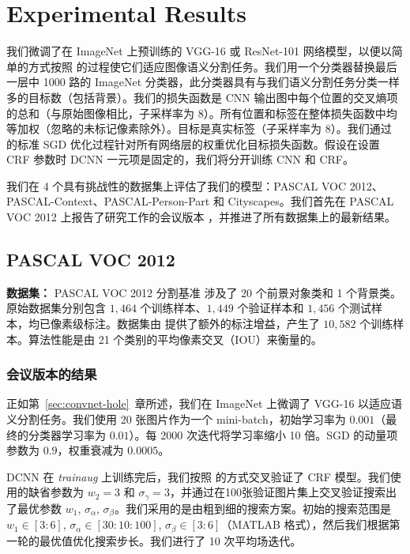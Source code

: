\section{Experimental Results}
\label{sec:experiments}

我们微调了在 ImageNet 上预训练的 VGG-16 或 ResNet-101 网络模型，以便以简单的方式按照 \cite{long2014fully} 的过程使它们适应图像语义分割任务。我们用一个分类器替换最后一层中 1000 路的 ImageNet 分类器，此分类器具有与我们语义分割任务分类一样多的目标数（包括背景）。我们的损失函数是 CNN 输出图中每个位置的交叉熵项的总和（与原始图像相比，子采样率为 8）。所有位置和标签在整体损失函数中均等加权（忽略的未标记像素除外）。目标是真实标签（子采样率为 8）。我们通过 \cite{KrizhevskyNIPS2013} 的标准 SGD 优化过程针对所有网络层的权重优化目标损失函数。假设在设置 CRF 参数时 DCNN 一元项是固定的，我们将分开训练 CNN 和 CRF。

我们在 4 个具有挑战性的数据集上评估了我们的模型：PASCAL VOC 2012、PASCAL-Context、PASCAL-Person-Part 和 Cityscapes。我们首先在 PASCAL VOC 2012 上报告了研究工作的会议版本 \cite{chen2014semantic}，并推进了所有数据集上的最新结果。

\subsection{PASCAL VOC 2012}

\textbf{数据集：} PASCAL VOC 2012 分割基准 \cite{everingham2014pascal} 涉及了 20 个前景对象类和 1 个背景类。原始数据集分别包含 $1,464$ 个训练样本、$1,449$ 个验证样本和 $1,456$ 个测试样本，均已像素级标注。数据集由 \cite{hariharan2011semantic} 提供了额外的标注增益，产生了 $10,582$ 个训练样本。算法性能是由 21 个类别的平均像素交叉（IOU）来衡量的。

\subsubsection{会议版本的结果}

正如第~\ref{sec:convnet-hole}~章所述，我们在 ImageNet 上微调了 VGG-16 以适应语义分割任务。我们使用 20 张图片作为一个 mini-batch，初始学习率为 $0.001$（最终的分类器学习率为 $0.01$）。每 2000 次迭代将学习率缩小 10 倍。SGD 的动量项参数为 $0.9$，权重衰减为 $0.0005$。

DCNN 在 \textit{trainaug} 上训练完后，我们按照 \cite{krahenbuhl2011efficient} 的方式交叉验证了 CRF 模型。我们使用的缺省参数为 $w_2 = 3$ 和 $\sigma_\gamma = 3$，并通过在100张验证图片集上交叉验证搜索出了最优参数 $w_1$, $\sigma_\alpha$, $\sigma_\beta$。我们采用的是由粗到细的搜索方案。初始的搜索范围是 $w_1\in[3:6]$, $\sigma_\alpha \in [30:10:100]$, $\sigma_\beta \in [3:6]$（MATLAB 格式），然后我们根据第一轮的最优值优化搜索步长。我们进行了 10 次平均场迭代。

